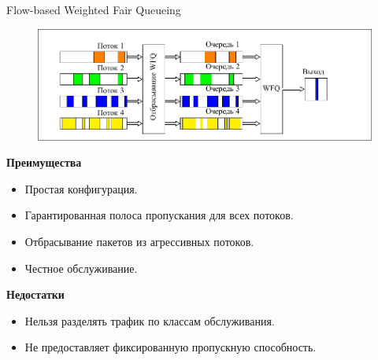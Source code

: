 \documentclass[12pt]{beamer}
\begin{document}
\begin{frame}{Flow-based Weighted Fair Queueing}
	\begin{figure}
		\center
    	\includegraphics[scale=0.6]{../text/src/pdfimages/fwfq.pdf}
	\end{figure}
	\begin{center}
        {\footnotesize
            \begin{multicols}{2}
				{\bf Преимущества}
				\begin{itemize}
					\item Простая конфигурация.
					\item Гарантированная полоса пропускания для всех потоков.
					\item Отбрасывание пакетов из агрессивных потоков.
					\item Честное обслуживание.
				\end{itemize}
            \columnbreak
				{\bf Недостатки}
				\begin{itemize}
					\item Нельзя разделять трафик по классам обслуживания.
					\item Не предоставляет фиксированную пропускную способность.
				\end{itemize}
            \end{multicols}
		}
	\end{center}
\end{frame}
\end{document}
